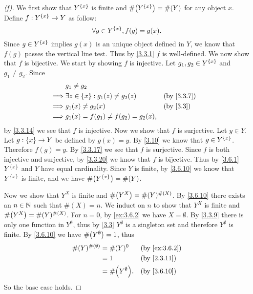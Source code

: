\begin{proof}[(f)]
	We first show that \(Y^{\left\lbrace x\right\rbrace}\) is finite and \(\#\pa{Y^{\set{x}}} = \#(Y)\) for any object \(x\).
	Define \(f : Y^{\left\lbrace x\right\rbrace} \to Y\) as follow:
	\[
		\forall g \in Y^{\left\lbrace x\right\rbrace}, f(g) = g(x).
	\]
	Since \(g \in Y^{\left\lbrace x\right\rbrace}\) implies \(g(x)\) is an unique object defined in \(Y\), we know that \(f(g)\) passes the vertical line test.
	Thus by \cref{3.3.1} \(f\) is well-defined.
	We now show that \(f\) is bijective.
	We start by showing \(f\) is injective.
	Let \(g_1, g_2 \in Y^{\left\lbrace x\right\rbrace}\) and \(g_1 \neq g_2\).
	Since
	\begin{align*}
		         & g_1 \neq g_2                                               \\
		\implies & \exists z \in \set{x} : g_1(z) \neq g_2(z) &  & \by{3.3.7} \\
		\implies & g_1(x) \neq g_2(x)                         &  & \by{3.3}   \\
		\implies & g_1(x) = f(g_1) \neq f(g_2) = g_2(x),
	\end{align*}
	by \cref{3.3.14} we see that \(f\) is injective.
	Now we show that \(f\) is surjective.
	Let \(y \in Y\).
	Let \(g : \left\lbrace x\right\rbrace \to Y\) be defined by \(g(x) = y\).
	By \cref{3.10} we know that \(g \in Y^{\left\lbrace x\right\rbrace}\).
	Therefore \(f(g) = y\).
	By \cref{3.3.17} we see that \(f\) is surjective.
	Since \(f\) is both injective and surjective, by \cref{3.3.20} we know that \(f\) is bijective.
	Thus by \cref{3.6.1} \(Y^{\left\lbrace x\right\rbrace}\) and \(Y\) have equal cardinality.
	Since \(Y\) is finite, by \cref{3.6.10} we know that \(Y^{\left\lbrace x\right\rbrace}\) is finite, and we have \(\#\pa{Y^{\set{x}}} = \#(Y)\).

	Now we show that \(Y^X\) is finite and \(\#\pa{Y^X} = \#(Y)^{\#(X)}\).
	By \cref{3.6.10} there exists an \(n \in \mathbb{N}\) such that \(\#(X) = n\).
	We induct on \(n\) to show that \(Y^X\) is finite and \(\#\pa{Y^X} = \#(Y)^{\#(X)}\).
	For \(n = 0\), by \cref{ex:3.6.2} we have \(X = \emptyset\).
	By \cref{3.3.9} there is only one function in \(Y^\emptyset\), thus by \cref{3.3} \(Y^\emptyset\) is a singleton set and therefore \(Y^\emptyset\) is finite.
	By \cref{3.6.10} we have \(\#\pa{Y^\emptyset} = 1\), thus
	\begin{align*}
		\#(Y)^{\#(\emptyset)} & = \#(Y)^0             &  & \by{ex:3.6.2} \\
		                      & = 1                   &  & \by{2.3.11}   \\
		                      & = \#\pa{Y^\emptyset}. &  & \by{3.6.10}
	\end{align*}
	So the base case holds.


\end{proof}
